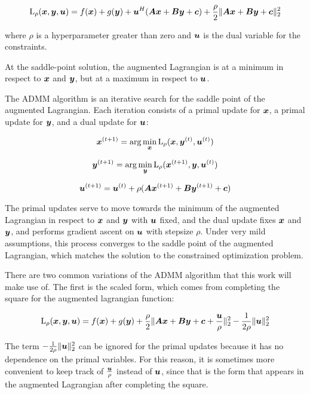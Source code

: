 \begin{equation}
\operatorname{L}_{\rho}(\bm{x},\bm{y},\bm{u}) = f(\bm{x}) + g(\bm{y}) + \bm{u}^H(\bm{A}\bm{x} + \bm{B}\bm{y} + \bm{c}) + \frac{\rho}{2}\|\bm{A}\bm{x} + \bm{B}\bm{y} + \bm{c}\|_2^2
\end{equation}

where $\rho$ is a hyperparameter greater than zero and $\bm{u}$ is the dual variable for the constraints.

At the saddle-point solution, the augmented Lagrangian is at a minimum in respect to $\bm{x}$ and $\bm{y}$, but at a maximum in respect to $\bm{u}$.

The ADMM algorithm is an iterative search for the saddle point of the augmented Lagrangian. Each iteration consists of a primal update for $\bm{x}$, a primal update for $\bm{y}$, and a dual update for $\bm{u}$:

\begin{equation}
\bm{x}^{(t + 1)} = \arg\min_{\bm{x}} \operatorname{L}_{\rho}(\bm{x},\bm{y}^{(t)},\bm{u}^{(t)})
\end{equation}

\begin{equation}
\bm{y}^{(t + 1)} = \arg\min_{\bm{y}} \operatorname{L}_{\rho}(\bm{x}^{(t + 1)},\bm{y},\bm{u}^{(t)})
\end{equation}

\begin{equation}
\bm{u}^{(t + 1)} = \bm{u}^{(t)} + \rho(\bm{A}\bm{x}^{(t + 1)} + \bm{B}\bm{y}^{(t + 1)} + \bm{c})
\end{equation}

The primal updates serve to move towards the minimum of the augmented Lagrangian in respect to $\bm{x}$ and $\bm{y}$ with $\bm{u}$ fixed, and the dual update fixes $\bm{x}$ and $\bm{y}$, and performs gradient ascent on $\bm{u}$ with stepsize $\rho$. Under very mild assumptions, this process converges to the saddle point of the augmented Lagrangian, which matches the solution to the constrained optimization problem.

There are two common variations of the ADMM algorithm that this work will make use of.  The first is the scaled form, which comes from completing the square for the augmented lagrangian function:

\begin{equation}
\operatorname{L}_{\rho}(\bm{x},\bm{y},\bm{u}) = f(\bm{x}) + g(\bm{y}) + \frac{\rho}{2}\|\bm{A}\bm{x} + \bm{B}\bm{y} + \bm{c} + \frac{\bm{u}}{\rho}\|_2^2 - \frac{1}{2\rho}\|\bm{u}\|_2^2
\end{equation}

The term $-\frac{1}{2\rho}\|\bm{u}\|_2^2$ can be ignored for the primal updates because it has no dependence on the primal variables. For this reason, it is sometimes more convenient to keep track of $\frac{\bm{u}}{\rho}$ instead of $\bm{u}$, since that is the form that appears in the augmented Lagrangian after completing the square.

